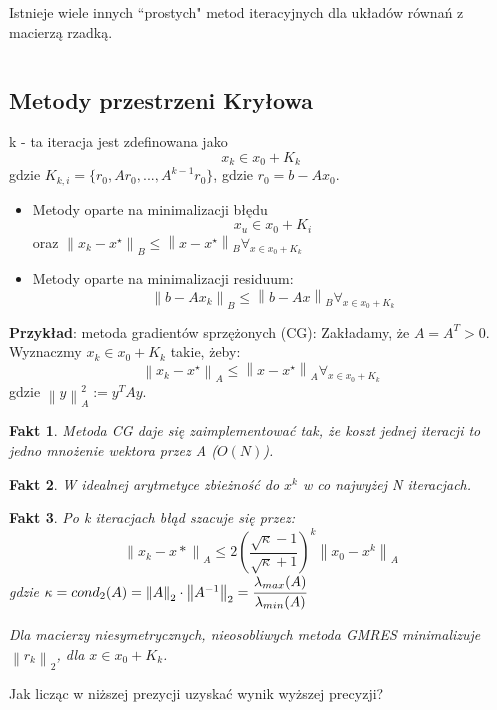 \documentclass[hidelinks,a4paper,fleqn,oneside]{book}
\newcommand{\norm}[1]{\left\lVert#1\right\rVert}
\newtheorem{fakt}{Fakt}
\begin{document}
Istnieje wiele innych ``prostych" metod iteracyjnych dla układów równań z macierzą rzadką.

$\quad$ 

\subsection{Metody przestrzeni Kryłowa}
k - ta iteracja jest zdefinowana jako
\[
	x_k \in x_0 + K_k
\]
gdzie $K_{k, i} = \{r_0, Ar_0, ..., A^{k-1}r_0\}$, gdzie $r_0 = b - Ax_0$.

\begin{itemize}
	\item Metody oparte na minimalizacji błędu
	      \[
	      	x_u \in x_0 + K_i
	      \]
	      oraz $\norm{x_k - x^\star}_B \leq \norm{x - x^\star}_B \forall_{x \in x_0 + K_k}$ 
	\item Metody oparte na minimalizacji residuum:
	      \[
	      	\norm{b - Ax_k}_B \leq \norm{b - Ax}_B \forall_{x \in x_0 + K_k}
	      \]
\end{itemize}
	
\textbf{Przykład}: metoda gradientów sprzężonych (CG):
Zakładamy, że $A = A^T > 0$. Wyznaczmy $x_k \in x_0 + K_k$ takie, żeby:
\[
	\norm{x_k - x^\star}_A \leq \norm{x - x^\star}_A \forall_{x \in x_0 + K_k}
\]
gdzie $\norm{y}_A^2 := y^T A y$.	
	
\begin{fakt} Metoda CG daje się zaimplementować tak, że koszt jednej iteracji to jedno mnożenie wektora przez A ($O(N)$).
\end{fakt}	

\begin{fakt} W idealnej arytmetyce zbieżność do $x^k$ w co najwyżej N iteracjach.
\end{fakt}	

\begin{fakt} Po k iteracjach błąd szacuje się przez:
	\[
		\norm{x_k - x*} _A \leq 2 \left(\frac{\sqrt{\kappa} - 1}{\sqrt{\kappa} + 1}\right)^k \norm{x_0 - x^k}_A
	\]
	gdzie $\kappa = cond_2(A) = \norm{A} _2 \cdot \norm{A^{-1}}_2 = \cfrac{\lambda_{max}(A)}{\lambda_{min}(A)}$
	
	Dla macierzy niesymetrycznych, nieosobliwych metoda GMRES minimalizuje $\norm{r_k}_2$, dla $x \in x_0 + K_k$.
\end{fakt}

Jak licząc w niższej prezycji uzyskać wynik wyższej precyzji?
\end{document}
